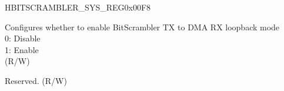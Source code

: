 \begin{register}{H}{BITSCRAMBLER\_SYS\_REG}{0x00F8}\label{regdesc:BITSCRAMBLERSYSREG}
%
%
%
\regnewline%
\begin{regdesc}\begin{reglist}
\label{fielddesc:BITSCRAMBLERLOOPMODE}\item [BITSCRAMBLER\_LOOP\_MODE] Configures whether to enable BitScrambler TX to DMA RX loopback mode\\
0: Disable\\
1: Enable\\
(R/W)
\label{fielddesc:BITSCRAMBLERCLKEN}\item [BITSCRAMBLER\_CLK\_EN] Reserved. (R/W)
\end{reglist}\end{regdesc}
\end{register}


